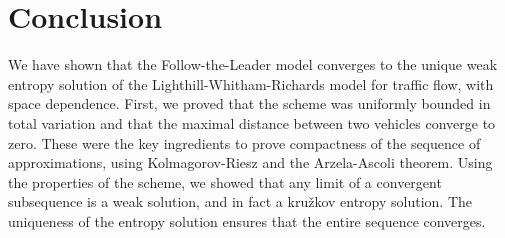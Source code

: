 \chapter{Conclusion}

We have shown that the Follow-the-Leader model converges to the unique weak entropy solution of the Lighthill-Whitham-Richards model for traffic flow, with space dependence. First, we proved that the scheme was uniformly bounded in total variation and that the maximal distance between two vehicles converge to zero. These were the key ingredients to prove compactness of the sequence of approximations, using Kolmagorov-Riesz and the Arzela-Ascoli theorem. Using the properties of the scheme, we showed that any limit of a convergent subsequence is a weak solution, and in fact a kružkov entropy solution. The uniqueness of the entropy solution ensures that the entire sequence converges. 
